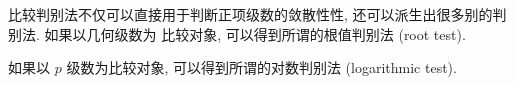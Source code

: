 比较判别法不仅可以直接用于判断正项级数的敛散性性, 还可以派生出很多别的判别法. 如果以几何级数为 比较对象, 可以得到所谓的根值判别法 (root test).

\begin{theorem}[Cauchy根值判别法]
    
\end{theorem}

\begin{theorem}[Cauchy根值判别法的极限形式]
    
\end{theorem}

如果以 $p$ 级数为比较对象, 可以得到所谓的对数判别法 (logarithmic test).

\begin{proposition}[对数判别法]
    
\end{proposition}

\begin{proposition}[对数判别法的极限形式]
    
\end{proposition}

